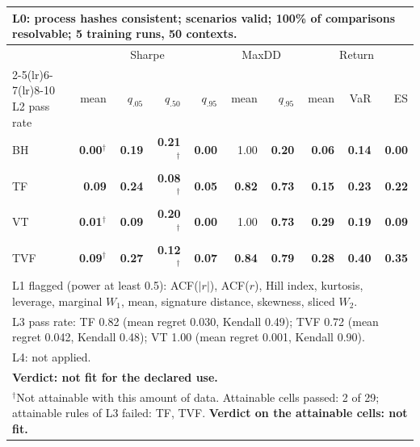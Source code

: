 \begin{tabular}{lrrrrrrrrr}
\toprule
\multicolumn{10}{p{13.5cm}}{L0: process hashes consistent; scenarios valid; 100\% of comparisons resolvable; 5 training runs, 50 contexts.} \\
\midrule
 & \multicolumn{4}{c}{Sharpe} & \multicolumn{2}{c}{MaxDD} & \multicolumn{3}{c}{Return} \\
\cmidrule(lr){2-5}\cmidrule(lr){6-7}\cmidrule(lr){8-10}
L2 pass rate & mean & $q_{.05}$ & $q_{.50}$ & $q_{.95}$ & mean & $q_{.95}$ & mean & VaR & ES \\
\midrule
BH & \textbf{0.00}$^{\dagger}$ & \textbf{0.19} & \textbf{0.21}$^{\dagger}$ & \textbf{0.00} & 1.00 & \textbf{0.20} & \textbf{0.06} & \textbf{0.14} & \textbf{0.00} \\
TF & \textbf{0.09} & \textbf{0.24} & \textbf{0.08}$^{\dagger}$ & \textbf{0.05} & \textbf{0.82} & \textbf{0.73} & \textbf{0.15} & \textbf{0.23} & \textbf{0.22} \\
VT & \textbf{0.01}$^{\dagger}$ & \textbf{0.09} & \textbf{0.20}$^{\dagger}$ & \textbf{0.00} & 1.00 & \textbf{0.73} & \textbf{0.29} & \textbf{0.19} & \textbf{0.09} \\
TVF & \textbf{0.09}$^{\dagger}$ & \textbf{0.27} & \textbf{0.12}$^{\dagger}$ & \textbf{0.07} & \textbf{0.84} & \textbf{0.79} & \textbf{0.28} & \textbf{0.40} & \textbf{0.35} \\
\midrule
\multicolumn{10}{p{13.5cm}}{L1 flagged (power at least 0.5): ACF($|r|$), ACF($r$), Hill index, kurtosis, leverage, marginal $W_1$, mean, signature distance, skewness, sliced $W_2$.} \\
\multicolumn{10}{p{13.5cm}}{L3 pass rate: TF 0.82 (mean regret 0.030, Kendall 0.49); TVF 0.72 (mean regret 0.042, Kendall 0.48); VT 1.00 (mean regret 0.001, Kendall 0.90).} \\
\multicolumn{10}{p{13.5cm}}{L4: not applied.} \\
\multicolumn{10}{p{13.5cm}}{\textbf{Verdict: not fit for the declared use.}} \\
\multicolumn{10}{p{13.5cm}}{$^{\dagger}$Not attainable with this amount of data. Attainable cells passed: 2 of 29; attainable rules of L3 failed: TF, TVF. \textbf{Verdict on the attainable cells: not fit.}} \\
\bottomrule
\end{tabular}
